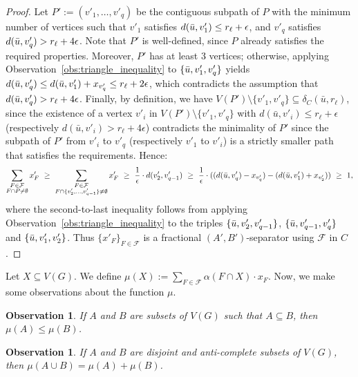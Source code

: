 \documentclass[11pt]{amsart}
\newtheorem{observation}[theorem]{Observation}
\begin{document}
\begin{proof}
    Let $P' := (v'_1, \dots, v'_q)$ be the contiguous subpath of $P$ with the minimum number of vertices such that $v'_1$ satisfies $d(\Bar{u}, v'_1) \leq r_\ell + \epsilon$, and $v'_q$ satisfies $d(\Bar{u}, v'_{q}) > r_\ell + 4\epsilon$. 
    Note that $P'$ is well-defined, since $P$ already satisfies the required properties.
    Moreover, $P'$ has at least 3 vertices; otherwise, applying Observation~\ref{obs:triangle_inequality} to $\{\Bar{u}, v'_1, v'_{q}\}$ yields $d(\Bar{u}, v'_q) \leq d(\Bar{u}, v'_{1}) + x_{v'_{q}} \leq r_\ell + 2\epsilon$, which contradicts the assumption that $d(\Bar{u}, v'_q) > r_\ell + 4\epsilon$. 
    Finally, by definition, we have $V(P')\setminus \{v'_1,v'_q\}\subseteq \delta_C(\bar{u}, r_\ell)$, since the existence of a vertex $v'_i$ in $V(P')\setminus \{v'_1,v'_q\}$ with $d(\bar{u},v'_i) \leq r_\ell+\epsilon$ (respectively $d(\bar{u},v'_i) > r_\ell+4\epsilon$) contradicts the minimality of $P'$ since the subpath of $P'$ from $v'_{i}$ to $v'_q$ (respectively $v'_1$ to $v'_{i}$) is a strictly smaller path that satisfies the requirements. 
    Hence:
    $$
    \sum_{\substack{F \in \mathcal{F}\\ F\cap P\neq \emptyset}} x'_F 
    \ \geq\  \sum_{\substack{F \in \mathcal{F} \\ F \cap \{v'_2, \dots, v'_{q-1}\} \neq \emptyset}} x'_F 
    \ \geq\  \frac{1}{\epsilon}\cdot d(v'_2,v'_{q-1})
    \ \geq\  \frac{1}{\epsilon}\cdot ((d(\Bar{u},v'_{q})-x_{v'_{q}})-(d(\Bar{u},v'_1)+x_{v'_2}))
    \ \geq\  1,
    $$ 
   where the second-to-last inequality follows from applying Observation~\ref{obs:triangle_inequality} to the triples $\{\Bar{u}, v'_2, v'_{q-1}\}$, $\{\Bar{u}, v'_{q-1}, v'_{q}\}$ and $\{\Bar{u}, v'_1, v'_{2}\}$. Thus $\{x'_F\}_{F \in \mathcal{F}}$ is a fractional $(A', B')$-separator using $\mathcal{F}$ in $C$.
\end{proof}

Let $X \subseteq V(G)$. We define $\mu(X) := \sum_{F \in \mathcal{F}} \alpha(F\cap X) \cdot x_F$. Now, we make some observations about the function $\mu$.

\begin{observation}\label{obs:mu_is_monotone}
    If $A$ and $B$ are subsets of $V(G)$ such that $A\subseteq B$, then $\mu(A) \leq \mu(B)$.
\end{observation}

\begin{observation}\label{obs:mu_is_additive}
   If $A$ and $B$ are disjoint and anti-complete subsets of $V(G)$, then $\mu(A \cup B) = \mu(A) + \mu(B)$.
\end{observation}
\end{document}
